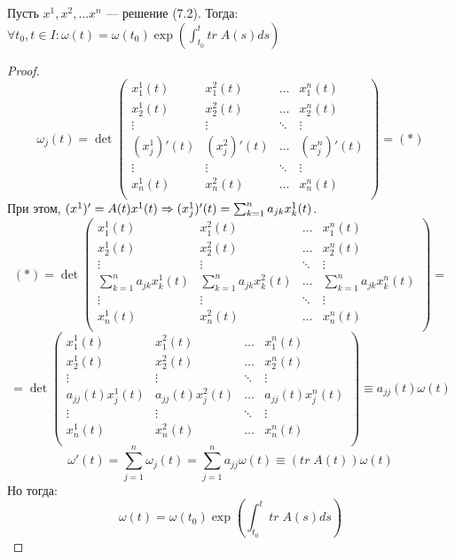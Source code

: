 \begin{theorem}
    Пусть \(x^1, x^2, \dots x^n\) --- решение (7.2). Тогда: \(\forall t_0, t \in I: \omega(t) = \omega(t_0)\exp\left( \int_{t_0}^t tr\;A(s) ds \right)\)
\end{theorem}
\begin{proof}
    \[\omega_j(t) = \det\left( \begin{array}{cccc}
        x_1^1(t) & x_1^2(t) & \dots & x_1^n(t) \\
        x_2^1(t) & x_2^2(t) & \dots & x_2^n(t) \\
        \vdots & \vdots & \ddots & \vdots \\
        (x_j^1)'(t) & (x_j^2)'(t) & \dots & (x_j^n)'(t) \\
        \vdots & \vdots & \ddots & \vdots \\
        x_n^1(t) & x_n^2(t) & \dots & x_n^n(t) \\
    \end{array} \right) = (*)\]
    При этом, \((x^1)' = A(t)x^1(t) \Rightarrow (x_j^1)'(t) = \sum_{k = 1}^n a_{jk}x_k^1(t)\).
    \[(*) = \det\left( \begin{array}{cccc}
        x_1^1(t) & x_1^2(t) & \dots & x_1^n(t) \\
        x_2^1(t) & x_2^2(t) & \dots & x_2^n(t) \\
        \vdots & \vdots & \ddots & \vdots \\
        \sum_{k = 1}^n a_{jk}x_k^1(t) & \sum_{k = 1}^n a_{jk}x_k^2(t) & \dots & \sum_{k = 1}^n a_{jk}x_k^n(t) \\
        \vdots & \vdots & \ddots & \vdots \\
        x_n^1(t) & x_n^2(t) & \dots & x_n^n(t) \\
    \end{array} \right) = \]
    \[ = \det\left( \begin{array}{cccc}
        x_1^1(t) & x_1^2(t) & \dots & x_1^n(t) \\
        x_2^1(t) & x_2^2(t) & \dots & x_2^n(t) \\
        \vdots & \vdots & \ddots & \vdots \\
        a_{jj}(t)x_j^1(t) & a_{jj}(t)x_j^2(t) & \dots & a_{jj}(t)x_j^n(t) \\
        \vdots & \vdots & \ddots & \vdots \\
        x_n^1(t) & x_n^2(t) & \dots & x_n^n(t) \\
    \end{array} \right) \equiv a_{jj}(t)\omega(t)\]
    \[\omega'(t) = \sum_{j = 1}^n \omega_j(t) = \sum_{j = 1}^n a_{jj}\omega(t) \equiv (tr\;A(t))\omega(t)\]
    Но тогда:
    \[\omega(t) = \omega(t_0)\exp\left( \int_{t_0}^t tr\;A(s) ds \right)\]
\end{proof}

